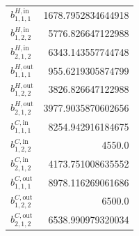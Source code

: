 \documentclass{article}%
\begin{document}
\begin{multicols*}{3}
\begin{supertabular}{lr}
	$b_{1,1,1}^{H,\text{in}}$ & 1678.7952834644918 \\%
	$b_{1,2,2}^{H,\text{in}}$ & 5776.826647122988 \\%
	$b_{2,1,2}^{H,\text{in}}$ & 6343.143557744748 \\%
	$b_{1,1,1}^{H,\text{out}}$ & 955.6219305874799 \\%
	$b_{1,2,2}^{H,\text{out}}$ & 3826.826647122988 \\%
	$b_{2,1,2}^{H,\text{out}}$ & 3977.9035870602656 \\%
	$b_{1,1,1}^{C,\text{in}}$ & 8254.942916184675 \\%
	$b_{1,2,2}^{C,\text{in}}$ & 4550.0 \\%
	$b_{2,1,2}^{C,\text{in}}$ & 4173.751008635552 \\%
	$b_{1,1,1}^{C,\text{out}}$ & 8978.116269061686 \\%
	$b_{1,2,2}^{C,\text{out}}$ & 6500.0 \\%
	$b_{2,1,2}^{C,\text{out}}$ & 6538.990979320034 \\%
\end{supertabular}%
\end{multicols*}%
\clearpage%
\end{document}
